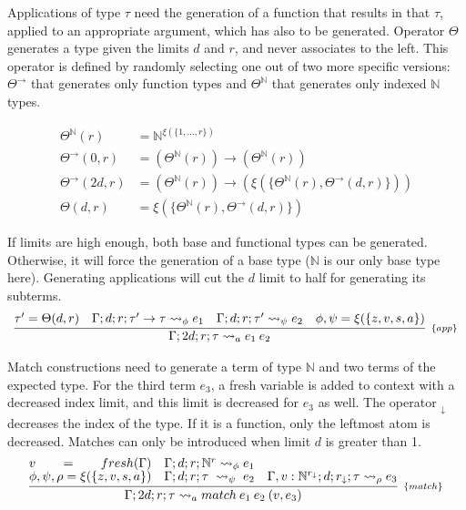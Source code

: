 \documentclass[runningheads]{llncs}
\newcommand{\tN}{\mathbb{N}}
\begin{document}
\noindent Applications of type $\tau$ need the generation of a 
function that results in that $\tau$, applied to an 
appropriate argument, which has also to be generated.
Operator $\Theta$ generates a type given the limits $d$ and 
$r$, and never associates to the left. This operator is defined by randomly 
selecting one out of two more specific versions: 
$\Theta^\to$ that generates only function types
and $\Theta^\tN$ that generates only indexed $\tN$ types.

\begin{align*}
  \Theta^\tN(r) &= \tN^{\xi(\{1, \dots, r\})}\\
  \Theta^\rightarrow(0, r) &= (\Theta^\tN(r)) \rightarrow (\Theta^\tN(r))\\
  \Theta^\rightarrow(2d, r) &= (\Theta^\tN(r)) \rightarrow (\xi(\{\Theta^\tN(r), \Theta^\rightarrow(d, r)\}))\\
  \Theta(d, r) &= \xi(\{\Theta^\tN(r), \Theta^\rightarrow(d, r)\})
  \end{align*}

  \noindent If limits are high enough, both base and functional types can be generated. Otherwise, it will force the generation of a base type ($\tN$ is our only base type here). Generating 
applications will cut the $d$ limit to half
for generating its subterms.
\[
\begin{array}{c}
\infer[_{\{app\}}]{\Gamma; 2d; r; \tau \leadsto_a e_1 \: e_2}{\tau' = \Theta(d, r) & \Gamma; d; r; \tau' \rightarrow \tau \leadsto_{\phi} e_1 & \Gamma; d; r; \tau' \leadsto_{\psi} e_2 & \phi, \psi = \xi(\{z, v, s, a\})}
\end{array}
\]



\noindent Match constructions need to generate a term of type $\tN$ and 
two terms of the expected type. For the third term $e_3$, 
a fresh variable is added to context with a decreased index 
limit, and this limit is decreased for $e_3$ as well. The 
operator $_\downarrow$ decreases the index of the type. If it 
is a function, only the leftmost atom is decreased. 
Matches can only be introduced when limit $d$ is greater than 1.
\[
\begin{array}{c}
\infer[_{\{match\}}]{\Gamma; 2d; r; \tau \leadsto_a match \: e_1 \: e_2 \: (v, e_3)}{v = fresh(\Gamma) & \Gamma; d; r; \tN^r \leadsto_{\phi} e_1 &  \\ \phi, \psi, \rho = \xi(\{z, v, s, a\}) & \Gamma; d; r; \tau \leadsto_{\psi} e_2 & \Gamma, v : \tN^{r_\downarrow}; d; r_\downarrow; \tau \leadsto_{\rho} e_3 }
\end{array}
\]
\end{document}
